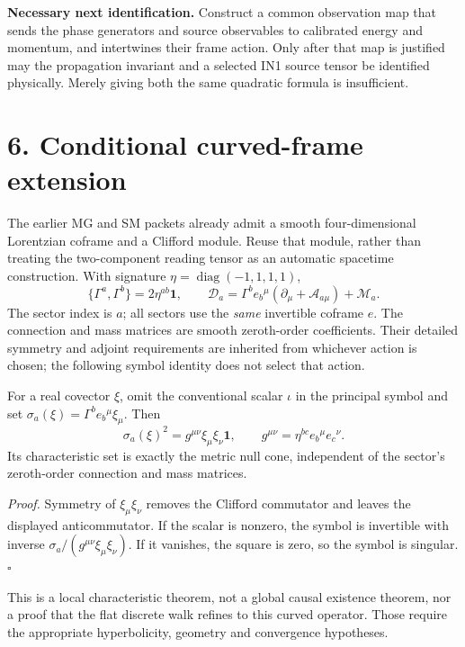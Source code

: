 \documentclass[11pt,a4paper]{article}
\newcommand{\ii}{\iota}\newcommand{\id}{\mathbf1}\newcommand{\dd}{\mathrm d}\newcommand{\tr}{\operatorname{Tr}}
\begin{document}
\textbf{Necessary next identification.} Construct a common observation map that sends the phase generators and source observables to calibrated energy and momentum, and intertwines their frame action. Only after that map is justified may the propagation invariant and a selected IN1 source tensor be identified physically. Merely giving both the same quadratic formula is insufficient.

\newpage
\section*{6. Conditional curved-frame extension}
The earlier MG and SM packets already admit a smooth four-dimensional Lorentzian coframe and a Clifford module. Reuse that module, rather than treating the two-component reading tensor as an automatic spacetime construction. With signature $\eta=\operatorname{diag}(-1,1,1,1)$,
\[
\{\Gamma^a,\Gamma^b\}=2\eta^{ab}\id,\qquad
\mathcal D_a=\Gamma^b e_b{}^\mu(\partial_\mu+\mathcal A_{a\mu})+\mathcal M_a.
\]
The sector index is $a$; all sectors use the \emph{same} invertible coframe $e$. The connection and mass matrices are smooth zeroth-order coefficients. Their detailed symmetry and adjoint requirements are inherited from whichever action is chosen; the following symbol identity does not select that action.

\begin{proposition}
For a real covector $\xi$, omit the conventional scalar $\ii$ in the principal symbol and set $\sigma_a(\xi)=\Gamma^b e_b{}^\mu\xi_\mu$. Then
\[
\boxed{\sigma_a(\xi)^2=g^{\mu\nu}\xi_\mu\xi_\nu\id,\qquad
g^{\mu\nu}=\eta^{bc}e_b{}^\mu e_c{}^\nu.}
\]
Its characteristic set is exactly the metric null cone, independent of the sector's zeroth-order connection and mass matrices.
\end{proposition}
\textit{Proof.} Symmetry of $\xi_\mu\xi_\nu$ removes the Clifford commutator and leaves the displayed anticommutator. If the scalar is nonzero, the symbol is invertible with inverse $\sigma_a/(g^{\mu\nu}\xi_\mu\xi_\nu)$. If it vanishes, the square is zero, so the symbol is singular. $\square$

This is a local characteristic theorem, not a global causal existence theorem, nor a proof that the flat discrete walk refines to this curved operator. Those require the appropriate hyperbolicity, geometry and convergence hypotheses.
\end{document}
